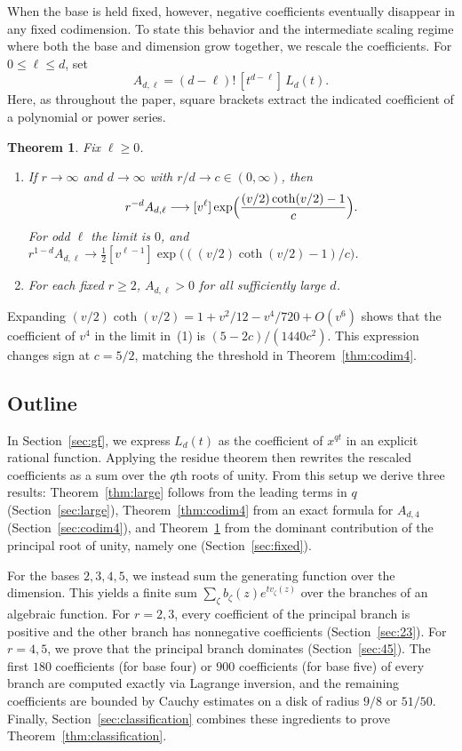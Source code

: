 \documentclass[11pt]{amsart}
\newtheorem{theorem}{Theorem}[section]
\theoremstyle{remark}
\begin{document}
When the base is held fixed, however, negative coefficients eventually
disappear in any fixed codimension. To state this behavior and the intermediate
scaling regime where both the base and dimension grow together, we rescale the
coefficients. For $0\le\ell\le d$, set
\[
 A_{d,\ell}=(d-\ell)!\,[t^{d-\ell}]\,L_d(t).
\]
Here, as throughout the paper, square brackets extract the indicated
coefficient of a polynomial or power series.

\begin{theorem}\label{thm:fixed}
Fix $\ell\ge0$.
\begin{enumerate}
\item If $r\to\infty$ and $d\to\infty$ with $r/d\to c\in(0,\infty)$, then
\[
 r^{-d}A_{d,\ell}\longrightarrow[v^\ell]\exp\Bigl(\frac{(v/2)\coth(v/2)-1}{c}\Bigr).
\]
For odd $\ell$ the limit is $0$, and $r^{1-d}A_{d,\ell}\to\frac12[v^{\ell-1}]\exp\bigl(((v/2)\coth(v/2)-1)/c\bigr)$.
\item For each fixed $r\ge2$, $A_{d,\ell}>0$ for all sufficiently large $d$.
\end{enumerate}
\end{theorem}

Expanding $(v/2)\coth(v/2)=1+v^2/12-v^4/720+O(v^6)$ shows that the coefficient
of $v^4$ in the limit in~(1) is $(5-2c)/(1440c^2)$. This expression changes
sign at $c=5/2$, matching the threshold in Theorem~\ref{thm:codim4}.

\subsection*{Outline}
In Section~\ref{sec:gf}, we express $L_d(t)$ as the coefficient of $x^{qt}$ in
an explicit rational function. Applying the residue theorem then rewrites the
rescaled coefficients as a sum over the $q$th roots of unity. From this setup
we derive three results: Theorem~\ref{thm:large} follows from the leading
terms in $q$ (Section~\ref{sec:large}), Theorem~\ref{thm:codim4} from an exact
formula for $A_{d,4}$ (Section~\ref{sec:codim4}), and Theorem~\ref{thm:fixed}
from the dominant contribution of the principal root of unity, namely one
(Section~\ref{sec:fixed}).

For the bases $2,3,4,5$, we instead sum the generating function over the
dimension. This yields a finite sum $\sum_\zeta b_\zeta(z)e^{tv_\zeta(z)}$
over the branches of an algebraic function. For $r=2,3$, every coefficient of
the principal branch is positive and the other branch has nonnegative
coefficients (Section~\ref{sec:23}). For $r=4,5$, we prove that the principal
branch dominates (Section~\ref{sec:45}). The first $180$ coefficients (for base
four) or $900$ coefficients (for base five) of every branch are computed
exactly via Lagrange inversion, and the remaining coefficients are bounded by
Cauchy estimates on a disk of radius $9/8$ or $51/50$. Finally,
Section~\ref{sec:classification} combines these ingredients to prove
Theorem~\ref{thm:classification}.
\end{document}
